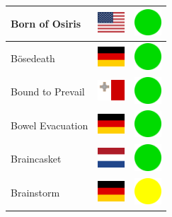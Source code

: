 \documentclass[12pt, a4paper, twoside]{report}
\begin{document}
\begin{center}
\begin{longtable}{|p{5cm}|p{2cm}|p{2cm}|}
 Born of Osiris                                             & \includegraphics[width=1cm]{../img/flags/us} &   \includegraphics[width=1cm]{../likes/y} \\ \hline
 Bösedeath                                                  & \includegraphics[width=1cm]{../img/flags/de} &   \includegraphics[width=1cm]{../likes/y} \\ \hline
 Bound to Prevail                                           & \includegraphics[width=1cm]{../img/flags/mt} &   \includegraphics[width=1cm]{../likes/y} \\ \hline
 Bowel Evacuation                                           & \includegraphics[width=1cm]{../img/flags/de} &   \includegraphics[width=1cm]{../likes/y} \\ \hline
 Braincasket                                                & \includegraphics[width=1cm]{../img/flags/nl} &   \includegraphics[width=1cm]{../likes/y} \\ \hline
 Brainstorm                                                 & \includegraphics[width=1cm]{../img/flags/de} &   \includegraphics[width=1cm]{../likes/m} \\ \hline

\end{longtable}
\end{center}
\end{document}
